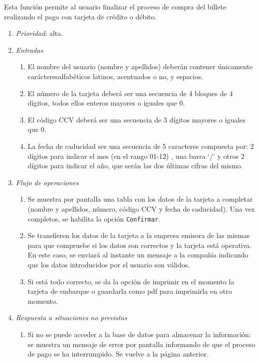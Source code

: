 
 \label{fun:pagotarjeta}
	Esta función permite al usuario finalizar el proceso de compra del billete realizando el pago con tarjeta de crédito o débito.

\begin{enumerate}
	\item \textit{Prioridad}: alta.
	\item \textit{Entradas}
	\begin{enumerate}
		\item El nombre del usuario (nombre y apellidos) deberán contener únicamente carácteres\break alfabéticos latinos, acentuados o no, y espacios.
		\item El número de la tarjeta deberá ser una secuencia de 4 bloques de 4 dígitos, todos ellos enteros mayores o iguales que 0.
		\item El código CCV deberá ser una secuencia de 3 dígitos mayores o iguales que 0.
		\item La fecha de caducidad  ser una secuencia de 5 caracteres compuesta por: 2 dígitos para indicar el mes (en el rango 01-12) , una barra `/'  y otros 2 dígitos para indicar el año, que serán las dos últimas cifras del mismo.
	\end{enumerate}
	\item \textit{Flujo de operaciones}
	\begin{enumerate}
		\item Se muestra por pantalla una tabla con los datos de la tarjeta a completar (nombre y apellidos, número, código CCV y fecha de caducidad). Una vez completos, se habilita la opción \verb|Confirmar|.
		\item Se transfieren los datos de la tarjeta a la empresa emisora de las mismas para que compruebe si los datos son correctos y la tarjeta está operativa. En este caso, se enviará al instante un mensaje a la compañía indicando que los datos introducidos por el usuario son válidos.
		\item Si está todo correcto, se da la opción de imprimir en el momento la tarjeta de embarque o guardarla como pdf para imprimirla en otro momento.
	\end{enumerate}
	\item \textit{Respuesta a situaciones no previstas}
	\begin{enumerate}
		\item Si no se puede acceder a la base de datos para almacenar la información: se muestra un mensaje de error por pantalla informando de que el proceso de pago se ha interrumpido. Se vuelve a la página anterior.

\end{enumerate}
\end{enumerate}
